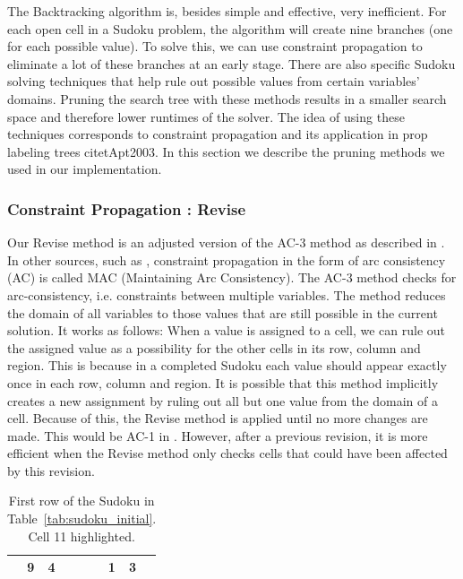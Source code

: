 \documentclass[11pt]{article} %
\begin{document}
The Backtracking algorithm is, besides simple and effective, very inefficient. For each open cell in a Sudoku problem, the algorithm will create nine branches (one for each possible value). To solve this, we can use constraint propagation to eliminate a lot of these branches at an early stage. There are also specific Sudoku solving techniques that help rule out possible values from certain variables' domains. Pruning the search tree with these methods results in a smaller search space and therefore lower runtimes of the solver. The idea of using these techniques corresponds to constraint propagation and its application in prop labeling trees citet{Apt2003}. In this section we describe the pruning methods we used in our implementation.

\subsubsection{Constraint Propagation : Revise}

Our Revise method is an adjusted version of the AC-3 method as described in \citet{BartakConsistency}.
In other sources, such as \citet{Apt2003}, constraint propagation in the form of arc consistency (AC) is called MAC (Maintaining Arc Consistency).
The AC-3 method checks for arc-consistency, i.e. constraints between multiple variables. The method reduces the domain of all variables to those values that are still possible in the current solution.
It works as follows: When a value is assigned to a cell, we can rule out the assigned value as a possibility for the other cells in its row, column and region. This is because in a completed Sudoku each value should appear exactly once in each row, column and region. It is possible that this method implicitly creates a new assignment by ruling out all but one value from the domain of a cell. Because of this, the Revise method is applied until no more changes are made. This would be AC-1 in \cite{BartakConsistency}. However, after a previous revision, it is more efficient when the Revise method only checks cells that could have been affected by this revision.

\begin{table}[htbp]
\caption{First row of the Sudoku in Table~\ref{tab:sudoku_initial}. Cell 11 highlighted.}
    \label{tab:sudoku_frstrow}

    \begin{center}
        \begin{tabular}{|c|c|c|c|c|c|c|c|c|}
        \hline
        \cellcolor[gray]{0.7} & 9 & 4 &  &  &  & 1 & 3 & \\
        \hline
        \end{tabular}
    \end{center}
\end{table}
\end{document}
